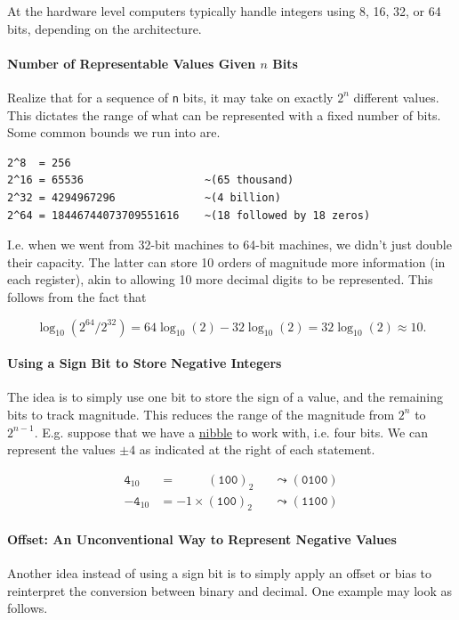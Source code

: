 \documentclass[12pt,letterpaper,twoside]{article}
\begin{document}
At the hardware level computers typically handle integers using 8, 16,
32, or 64 bits, depending on the architecture.

\vspace{-3ex}
\paragraph{Number of Representable Values Given $n$ Bits}
Realize that for a sequence of \texttt{n} bits, it may take on exactly
$2^n$ different values.
This dictates the range of what can be represented with a fixed number
of bits. Some common bounds we run into are.
\begin{verbatim}
2^8  = 256
2^16 = 65536                   ~(65 thousand)
2^32 = 4294967296              ~(4 billion)
2^64 = 18446744073709551616    ~(18 followed by 18 zeros)
\end{verbatim}

I.e. when we went from 32-bit machines to 64-bit machines, we didn't
just double their capacity. The latter can store
10 orders of magnitude more information (in each register), akin to allowing 10
more decimal digits to be represented. This follows from the fact that

$$
\log_{10}(2^{64} / 2^{32}) = 64 \log_{10}(2) - 32 \log_{10}(2) = 32
\log_{10}(2) \approx 10.
$$

\vspace{-3ex}
\paragraph{Using a Sign Bit to Store Negative Integers}
The idea is to simply use one bit to store the sign of a value, and
the remaining bits to track magnitude.
This reduces the range of the magnitude from $2^n$ to
$2^{n-1}$. E.g. suppose that we have a
\href{https://en.wikipedia.org/wiki/Nibble}{nibble} to work with,
i.e. four bits. We can represent the values
$\pm 4$ as indicated at the right of each statement.

\begin{align*}
  \texttt{4}_{10} &= \hspace{30pt} (\texttt{100})_2 &&\leadsto (\texttt{0100}) \\
  -\texttt{4}_{10} &= -1 \times (\texttt{100})_2 &&\leadsto (\texttt{1100})
\end{align*}

\paragraph{Offset: An Unconventional Way to Represent Negative Values}
Another idea instead of using a sign bit is to simply
apply an offset or bias to reinterpret the conversion between binary
and decimal. One example may look as follows.
\end{document}
